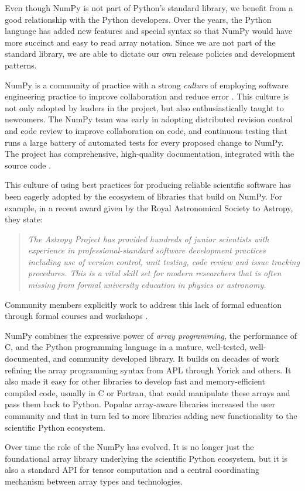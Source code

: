 Even though NumPy is not part of Python's standard library,
we benefit from a good relationship with the Python developers.
Over the years, the Python language has added new features and
special syntax so that NumPy would have more succinct and 
easy to read array notation.
Since we are not part of the standard library, we are able to
dictate our own release policies and development patterns.

NumPy is a community of practice with a strong \emph{culture} of
employing software engineering practice to improve collaboration and
reduce error \cite{millman2014developing}.  This culture is not only
adopted by leaders in the project, but also enthusiastically taught to
newcomers. The NumPy team was early in adopting distributed revision
control and code review to improve collaboration on code, and
continuous testing that runs a large battery of automated tests for
every proposed change to NumPy.  The project has comprehensive,
high-quality documentation, integrated with the source
code \cite{vanderwalt2008scipy,harrington2008scipy,harrington2009scipy}.


This culture of using best practices for producing reliable scientific software
has been eagerly adopted by the ecosystem of libraries that build on NumPy.
For example, in a recent award given by the Royal Astronomical Society to
Astropy, they state:
\begin{quotation}
\noindent\emph{The Astropy Project has provided hundreds of junior scientists
with experience in professional-standard software development practices
including use of version control, unit testing, code review and issue tracking
procedures. This is a vital skill set for modern researchers that is often
missing from formal university education in physics or astronomy.}
\end{quotation}
Community members explicitly work to address this lack of formal education
through formal courses and workshops
\cite{wilson-software-carpentry,hannay-scientific-software-survey,millman2018teaching}.

NumPy combines the expressive power of \emph{array programming}, 
the performance of C, and the Python programming language in a mature,
well-tested, well-documented, and community developed library.
It builds on decades of work refining the array programming
syntax from APL through Yorick and others.
It also made it easy for other libraries to develop fast and
memory-efficient compiled code, usually in C or Fortran, that could manipulate
these arrays and pass them back to Python.
Popular array-aware libraries increased the user community and that
in turn led to more libraries adding new functionality
to the scientific Python ecosystem.


Over time the role of the NumPy has evolved. It is no longer just the
foundational array library underlying the scientific Python ecosystem,
but it is also a standard API for tensor computation and a
central coordinating mechanism between array types and technologies.
